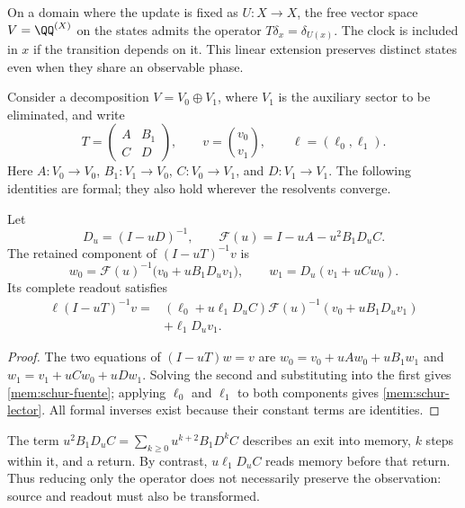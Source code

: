 On a domain where the update is fixed as \(U:X\to X\),
the free vector space \(V=\QQ^{(X)}\) on the states admits the operator
\(T\delta_x=\delta_{U(x)}\). The clock is included in \(x\) if the
transition depends on it. This linear extension preserves distinct states
even when they share an observable phase.

Consider a decomposition \(V=V_0\oplus V_1\), where \(V_1\)
is the auxiliary sector to be eliminated, and write
\[
 T=\begin{pmatrix}A&B_1\\C&D\end{pmatrix},\qquad
 v=\binom{v_0}{v_1},\qquad \ell=(\ell_0,\ell_1).
\]
Here \(A:V_0\to V_0\), \(B_1:V_1\to V_0\),
\(C:V_0\to V_1\), and \(D:V_1\to V_1\).
The following identities are formal; they also hold wherever the
resolvents converge.

\begin{proposition}
\label{mem:prop-schur}
Let
\[
 D_u=(I-uD)^{-1},\qquad
 \mathscr F(u)=I-uA-u^2B_1D_uC.
\]
The retained component of \((I-uT)^{-1}v\) is
\begin{equation}
 w_0=\mathscr F(u)^{-1}\bigl(v_0+uB_1D_uv_1\bigr),
 \qquad w_1=D_u(v_1+uCw_0).
 \label{mem:schur-fuente}
\end{equation}
Its complete readout satisfies
\begin{equation}
 \begin{split}
 \ell(I-uT)^{-1}v
 ={}&(\ell_0+u\ell_1D_uC)
       \mathscr F(u)^{-1}(v_0+uB_1D_uv_1)\\
    &+\ell_1D_uv_1.
 \end{split}
 \label{mem:schur-lector}
\end{equation}
\end{proposition}
\begin{proof}
The two equations of \((I-uT)w=v\) are
\(w_0=v_0+uAw_0+uB_1w_1\) and
\(w_1=v_1+uCw_0+uDw_1\).
Solving the second and substituting into the first gives
\eqref{mem:schur-fuente}; applying \(\ell_0\) and \(\ell_1\)
to both components gives \eqref{mem:schur-lector}.
All formal inverses exist because their constant terms
are identities.
\end{proof}

The term \(u^2B_1D_uC=\sum_{k\geq0}u^{k+2}B_1D^kC\)
describes an exit into memory, \(k\) steps within it, and
a return. By contrast, \(u\ell_1D_uC\) reads memory before that
return. Thus reducing only the operator does not necessarily preserve
the observation: source and readout must also be transformed.

